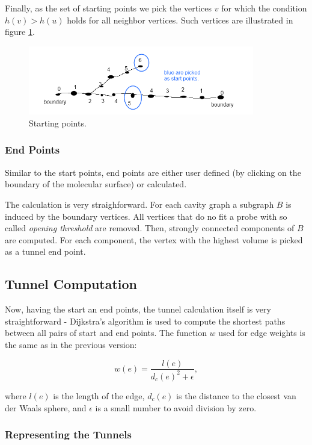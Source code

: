 \documentclass[11pt]{article} %
\begin{document}
Finally, as the set of starting points we pick the vertices $v$ for which the condition $h(v) > h(u)$ holds for all neighbor vertices. Such vertices are illustrated in figure \ref{fig:start}.

\begin{figure}[h]
\centering\includegraphics[width=0.88\textwidth]{start}
\caption{Starting points.}
\label{fig:start}
\end{figure}

\subsubsection{End Points}
Similar to the start points, end points are either user defined (by clicking on the boundary of the molecular surface) or calculated.

The calculation is very straighforward. For each cavity graph a subgraph $B$ is induced by the boundary vertices. All vertices that do no fit a probe with so called \textit{opening threshold} are removed. Then, strongly connected components of $B$ are computed. For each component, the vertex with the highest volume is picked as a tunnel end point.
\subsection{Tunnel Computation}

Now, having the start an end points, the tunnel calculation itself is very straightforward - Dijkstra's algorithm is used to compute the shortest paths between all pairs of start and end points. The function $w$ used for edge weights is the same as in the previous version:

\[
w(e)=\frac{l(e)}{d_c(e)^2+\epsilon},
\]

where $l(e)$ is the length of the edge, $d_c(e)$ is the distance to the closest van der Waals sphere, and $\epsilon$ is a small number to avoid division by zero.

\subsubsection{Representing the Tunnels}
\end{document}
